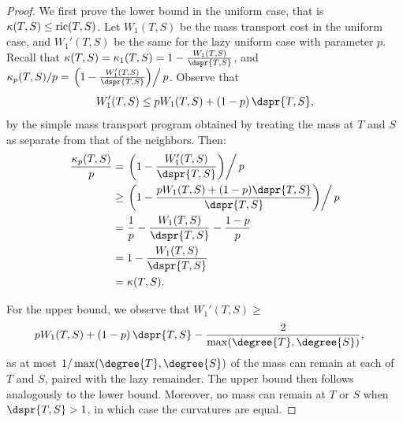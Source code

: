 \documentclass[10pt,twoside,leqno,twocolumn]{article}
\newcommand{\curvature}[2][]{%
    \ifthenelse{\equal{#1}{}}%
		{\kappa(#2)}%
		{\kappa_{#1}(#2)}%
}
\newcommand{\ric}[1]{
	\operatorname{ric}(#1)%
}
\begin{document}
\asymptotic*
\begin{proof}
	We first prove the lower bound in the uniform case, that is $\curvature{T,S} \le \ric{T,S}$.
	Let $W_1(T,S)$ be the mass transport cost in the uniform case, and $W_1'(T,S)$ be the same for the lazy uniform case with parameter $p$.
	Recall that $\curvature{T,S} = \curvature[1]{T,S} = 1 - \frac{W_1(T,S)}{\dspr{T,S}}$, and $\curvature[p]{T,S} / p = \left. \left(1 - \frac{W_1'(T,S)}{\dspr{T,S}}\right) \right/ p$.
	Observe that $$W_1'(T,S) \le pW_1(T,S) + (1-p) \, \dspr{T,S},$$ by the simple mass transport program obtained by treating the mass at $T$ and $S$ as separate from that of the neighbors.
	Then:
	\begin{align*}
		\frac{\curvature[p]{T,S}}{p} &= \left. \left(1 - \frac{W_1'(T,S)}{\dspr{T,S}}\right) \right/ p \\
		&\ge \left. \left(1 - \frac{pW_1(T,S) + (1-p)\dspr{T,S}}{\dspr{T,S}}\right) \right/ p \\
		&= \frac{1}{p} - \frac{W_1(T,S)}{\dspr{T,S}} - \frac{1-p}{p} \\
		&= 1 - \frac{W_1(T,S)}{\dspr{T,S}} \\
		&= \curvature{T,S}.
	\end{align*}

	For the upper bound, we observe that $W_1'(T,S) \ge$
	\begin{align*}
		p &W_1(T,S) + (1-p) \, \dspr{T,S} - \frac{2}{\max(\degree{T}, \degree{S})},
	\end{align*}
	as at most $1 / \max(\degree{T},\degree{S})$ of the mass can remain at each of $T$ and $S$, paired with the lazy remainder.
	The upper bound then follows analogously to the lower bound.
	Moreover, no mass can remain at $T$ or $S$ when $\dspr{T,S} > 1$, in which case the curvatures are equal.
\end{proof}
\end{document}
